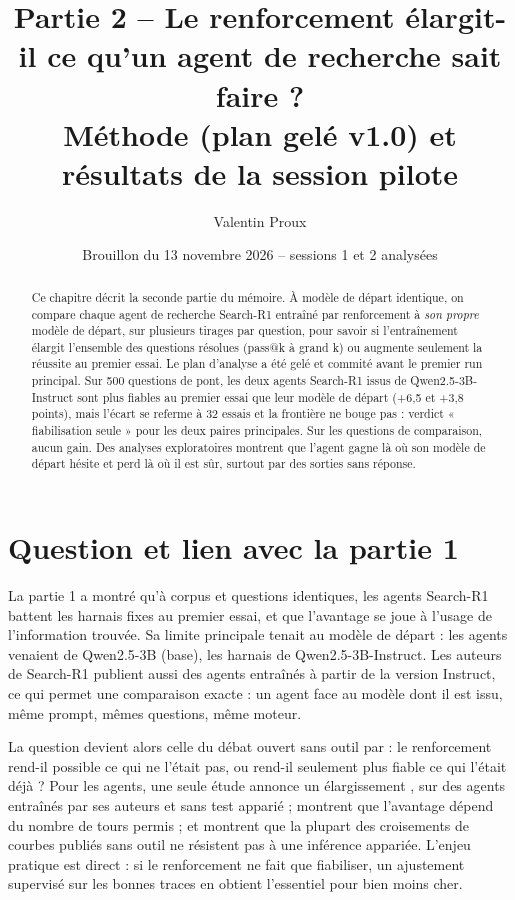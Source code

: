 \documentclass[11pt,a4paper]{article}
\title{Partie 2 -- Le renforcement élargit-il ce qu'un agent de recherche sait faire ?\\[4pt]
\large Méthode (plan gelé v1.0) et résultats de la session pilote}
\author{Valentin Proux}
\date{Brouillon du 13 novembre 2026 -- sessions 1 et 2 analysées}
\begin{document}
\maketitle

\begin{abstract}
\noindent Ce chapitre décrit la seconde partie du mémoire. À modèle de départ identique, on compare chaque agent de recherche Search-R1 entraîné par renforcement à \emph{son propre} modèle de départ, sur plusieurs tirages par question, pour savoir si l'entraînement élargit l'ensemble des questions résolues (pass@k à grand k) ou augmente seulement la réussite au premier essai. Le plan d'analyse a été gelé et commité avant le premier run principal. Sur 500 questions de pont, les deux agents Search-R1 issus de Qwen2.5-3B-Instruct sont plus fiables au premier essai que leur modèle de départ (+6,5 et +3,8 points), mais l'écart se referme à 32 essais et la frontière ne bouge pas : verdict « fiabilisation seule » pour les deux paires principales. Sur les questions de comparaison, aucun gain. Des analyses exploratoires montrent que l'agent gagne là où son modèle de départ hésite et perd là où il est sûr, surtout par des sorties sans réponse.
\end{abstract}

\section{Question et lien avec la partie 1}

La partie 1 a montré qu'à corpus et questions identiques, les agents Search-R1 battent les harnais fixes au premier essai, et que l'avantage se joue à l'usage de l'information trouvée. Sa limite principale tenait au modèle de départ : les agents venaient de Qwen2.5-3B (base), les harnais de Qwen2.5-3B-Instruct. Les auteurs de Search-R1 publient aussi des agents entraînés à partir de la version Instruct, ce qui permet une comparaison exacte : un agent face au modèle dont il est issu, même prompt, mêmes questions, même moteur.

La question devient alors celle du débat ouvert sans outil par \citet{yue2025does} : le renforcement rend-il possible ce qui ne l'était pas, ou rend-il seulement plus fiable ce qui l'était déjà ? Pour les agents, une seule étude annonce un élargissement \citep{zhai2026does}, sur des agents entraînés par ses auteurs et sans test apparié ; \citet{zhu2026what} montrent que l'avantage dépend du nombre de tours permis ; et \citet{yang2026crossovers} montrent que la plupart des croisements de courbes publiés sans outil ne résistent pas à une inférence appariée. L'enjeu pratique est direct : si le renforcement ne fait que fiabiliser, un ajustement supervisé sur les bonnes traces en obtient l'essentiel pour bien moins cher.
\end{document}
